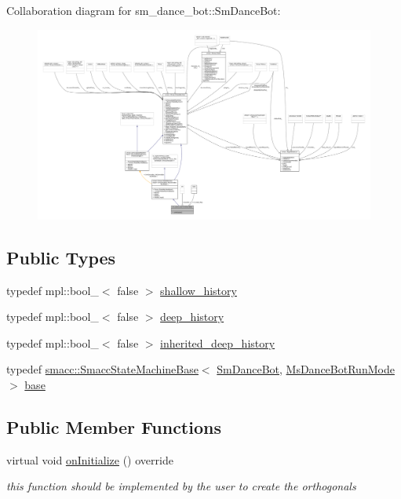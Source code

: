 Collaboration diagram for sm\+\_\+dance\+\_\+bot\+:\+:Sm\+Dance\+Bot\+:
\nopagebreak
\begin{figure}[H]
\begin{center}
\leavevmode
\includegraphics[width=350pt]{structsm__dance__bot_1_1SmDanceBot__coll__graph}
\end{center}
\end{figure}
\subsection*{Public Types}
\begin{DoxyCompactItemize}
\item 
typedef mpl\+::bool\+\_\+$<$ false $>$ \hyperlink{structsm__dance__bot_1_1SmDanceBot_a780b2408077887cc9c888ed0a95bff68}{shallow\+\_\+history}
\item 
typedef mpl\+::bool\+\_\+$<$ false $>$ \hyperlink{structsm__dance__bot_1_1SmDanceBot_abd58ec4a2b50a45da304a5f0b9c44706}{deep\+\_\+history}
\item 
typedef mpl\+::bool\+\_\+$<$ false $>$ \hyperlink{structsm__dance__bot_1_1SmDanceBot_a9bc29171f1a5e3cfd09824a06f6a8058}{inherited\+\_\+deep\+\_\+history}
\item 
typedef \hyperlink{structsmacc_1_1SmaccStateMachineBase}{smacc\+::\+Smacc\+State\+Machine\+Base}$<$ \hyperlink{structsm__dance__bot_1_1SmDanceBot}{Sm\+Dance\+Bot}, \hyperlink{classsm__dance__bot_1_1MsDanceBotRunMode}{Ms\+Dance\+Bot\+Run\+Mode} $>$ \hyperlink{structsm__dance__bot_1_1SmDanceBot_a33b03e67fc72482c067af48e1f9d95a3}{base}
\end{DoxyCompactItemize}
\subsection*{Public Member Functions}
\begin{DoxyCompactItemize}
\item 
virtual void \hyperlink{structsm__dance__bot_1_1SmDanceBot_a1baf6710e3e4755483e1e8441bb0f910}{on\+Initialize} () override
\begin{DoxyCompactList}\small\item\em this function should be implemented by the user to create the orthogonals \end{DoxyCompactList}\end{DoxyCompactItemize}
